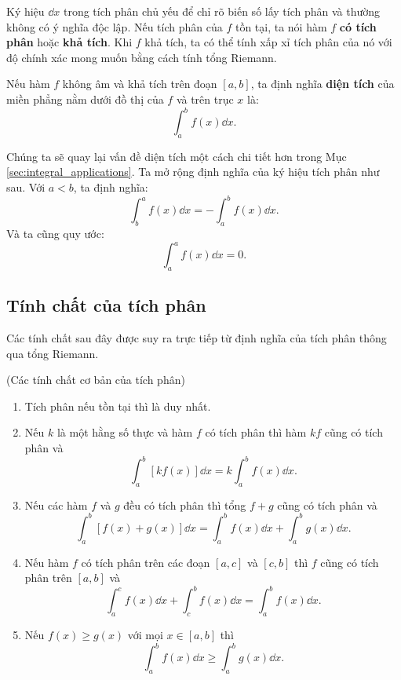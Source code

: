 Ký hiệu $\dd x$ trong tích phân chủ yếu để chỉ rõ biến số lấy tích phân và thường không có ý nghĩa độc lập. Nếu tích phân của $f$ tồn tại, ta nói hàm $f$ \textbf{có tích phân} hoặc \textbf{khả tích}. Khi $f$ khả tích, ta có thể tính xấp xỉ tích phân của nó với độ chính xác mong muốn bằng cách tính tổng Riemann.

\begin{definition}
    Nếu hàm $f$ không âm và khả tích trên đoạn $[a, b]$, ta định nghĩa \textbf{diện tích} của miền phẳng nằm dưới đồ thị của $f$ và trên trục $x$ là:
    \[ \int_{a}^{b} f(x) \dd x. \]
\end{definition}

Chúng ta sẽ quay lại vấn đề diện tích một cách chi tiết hơn trong Mục  \ref{sec:integral_applications}. Ta mở rộng định nghĩa của ký hiệu tích phân như sau. Với $a < b$, ta định nghĩa:
\[ \int_{b}^{a} f(x) \dd x = - \int_{a}^{b} f(x) \dd x. \]
Và ta cũng quy ước:
\[ \int_{a}^{a} f(x) \dd x = 0. \]

\subsection{Tính chất của tích phân}

Các tính chất sau đây được suy ra trực tiếp từ định nghĩa của tích phân thông qua tổng Riemann.

\begin{proposition} (Các tính chất cơ bản của tích phân)
    \begin{enumerate}[label=(\alph*)]
        \item Tích phân nếu tồn tại thì là duy nhất.
        
        \item Nếu $k$ là một hằng số thực và hàm $f$ có tích phân thì hàm $kf$ cũng có tích phân và
        \[ \int_{a}^{b} [k f(x)] \dd x = k \int_{a}^{b} f(x) \dd x. \]
        
        \item Nếu các hàm $f$ và $g$ đều có tích phân thì tổng $f+g$ cũng có tích phân và
        \[ \int_{a}^{b} [f(x) + g(x)] \dd x = \int_{a}^{b} f(x) \dd x + \int_{a}^{b} g(x) \dd x. \]
        
        \item Nếu hàm $f$ có tích phân trên các đoạn $[a, c]$ và $[c, b]$ thì $f$ cũng có tích phân trên $[a, b]$ và
        \[ \int_{a}^{c} f(x) \dd x + \int_{c}^{b} f(x) \dd x = \int_{a}^{b} f(x) \dd x. \]
        
        \item Nếu $f(x) \ge g(x)$ với mọi $x \in [a, b]$ thì
        \[ \int_{a}^{b} f(x) \dd x \ge \int_{a}^{b} g(x) \dd x. \]
    \end{enumerate}
\end{proposition}

